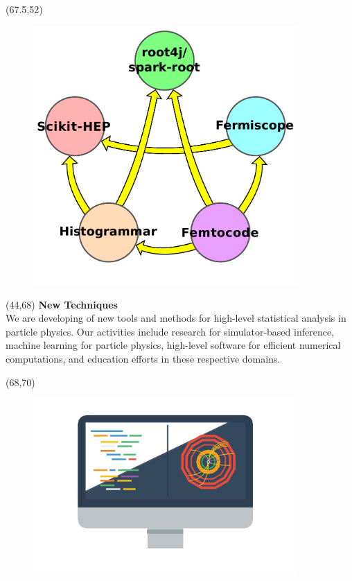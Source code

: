 \documentclass[final]{beamer}
\begin{document}
\begin{frame}{}
\begin{textblock}{12.5}(67.5,52)
\begin{figure}[tbph]
\centering
\includegraphics[width=0.9\textwidth]{relationships_nolabels.pdf}
\end{figure}
\end{textblock}

\begin{textblock}{23}(44,68)
\textcolor{mybluelabel}{\bf New Techniques} \\
We are developing of new tools and methods for
high-level statistical analysis in particle physics. Our activities
include research for simulator-based inference, machine learning for
particle physics, high-level software for efficient numerical
computations, and education efforts in these respective domains.
\end{textblock}

\begin{textblock}{12.0}(68,70)
\begin{figure}[tbph]
\centering
\includegraphics[width=0.9\textwidth]{better-software.jpg}
\end{figure}
\end{textblock}


\end{frame}
\end{document}
